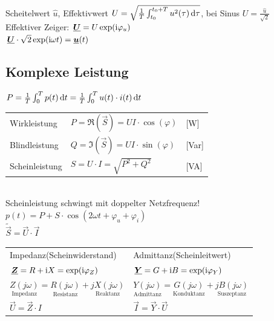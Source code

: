 \documentclass[fs, footer]{latex4ei}
\begin{document}
\begin{multicols}{4}
	
		Scheitelwert $\hat u$, Effektivwert $U = \sqrt{\frac{1}{T} \int_{t_0}^{t_0 + T} u^2(\tau) \diff \tau}$,
		bei Sinus $U = \frac{\hat u}{\sqrt{2}}$\\
		Effektiver Zeiger: $\underline{\boldsymbol {U}} = U \exp(\mathrm{i} \varphi_u)$\\
		
		$\underline{\boldsymbol {U}} \cdot \sqrt{2} \exp(\mathrm{i} \omega t) = \underline{\boldsymbol {u}}(t)$	
	

	
		\subsection{Komplexe Leistung}
		$P = \frac1T \int_0^{T} p(t) \diff t = \frac1T \int_0^{T} u(t) \cdot i(t) \diff t$\\
		\begin{tabular}{lll}
		Wirkleistung & $P = \Re(\vec S) = U I \cdot \cos(\varphi)$ & [W] \\
		Blindleistung & $Q = \Im(\vec S) = U I \cdot \sin(\varphi)$ & [Var]\\
		Scheinleistung & $S = U \cdot I = \sqrt{P^2 + Q^2}$ & [VA]\\
		\end{tabular}
		 \qquad
		\\
		
		Scheinleistung schwingt mit doppelter Netzfrequenz!
		$p(t) = P + S \cdot \cos(2\omega t + \varphi_u + \varphi_i)$\\
		$\tilde {\vec S} = \vec U \cdot \vec I$\\

		\begin{tabular}{ll}
		Impedanz(Scheinwiderstand) & Admittanz(Scheinleitwert)\\
		$\underline{\boldsymbol {Z}} = R + \mathrm{i} X = \exp(\mathrm{i} \varphi_Z)$ & $\underline{\boldsymbol {Y}} = G + \mathrm{i} B = \exp(\mathrm{i} \varphi_Y)$\\
		$\underset{\text{Impedanz}}{Z(j\omega)} = \underset{\text{Resistanz}}{R(j\omega)} + \underset{\text{Reaktanz}}{jX(j\omega)}$ & 	$\underset{\text{Admittanz}}{Y(j\omega)} = \underset{\text{Konduktanz}}{G(j\omega)} + \underset{\text{Suszeptanz}}{jB(j\omega)}$\\
		$\vec U = \vec Z \cdot I $ & $\vec I = \vec Y \cdot \vec U$\\


\end{tabular}
\end{multicols}
\end{document}
